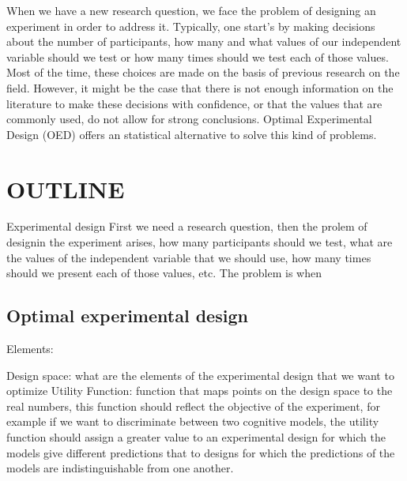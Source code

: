 \documentclass[preprint,review,12pt]{elsarticle}
\begin{document}
When we have a new research question, we face the problem of designing an experiment in order to address it. Typically, one start's by making decisions about the number of participants, how many and what values of our independent variable should we test or how many times should we test each of those values. Most of the time, these choices are made on the basis of previous research on the field. However, it might be the case that there is not enough information on the literature to make these decisions with confidence, or that the values that are commonly used, do not allow for strong conclusions. Optimal Experimental Design (OED) offers an statistical alternative to solve this kind of problems.


\section{OUTLINE}

Experimental design
First we need a research question, then the prolem of designin the experiment arises, how many participants should we test, what are the values of the independent variable that we should use, how many times should we present each of those values, etc. The problem is when 


% 
% 

\subsection{Optimal experimental design}

Elements:

Design space: what are the elements of the experimental design that we want to optimize
Utility Function: function that maps points on the design space to the real numbers, this function should reflect the objective of the experiment, for example if we want to discriminate between two cognitive models, the utility function should assign a greater value to an experimental design for which the models give different predictions that to designs for which the predictions of the models are indistinguishable from one another.


\end{document}
